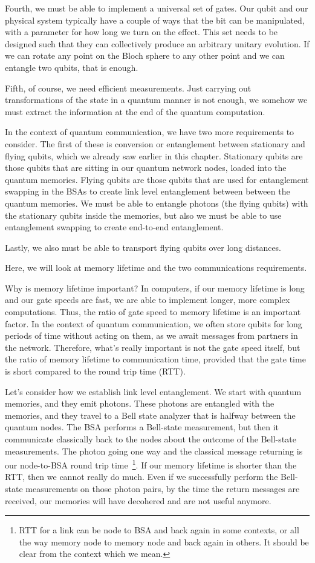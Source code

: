 Fourth, we must be able to implement a universal set of gates. Our qubit and our physical system typically have a couple of ways that the bit can be manipulated, with a parameter for how long we turn on the effect.  This set needs to be designed such that they can collectively produce an arbitrary unitary evolution. If we can rotate any point on the Bloch sphere to any other point and we can entangle two qubits, that is enough.

Fifth, of course, we need efficient measurements. Just carrying out transformations of the state in a quantum manner is not enough, we somehow we must extract the information at the end of the quantum computation.

In the context of quantum communication, we have two more requirements to consider. The first of these is conversion or entanglement between stationary and flying qubits, which we already saw earlier in this chapter. Stationary qubits are those qubits that are sitting in our quantum network nodes, loaded into the quantum memories.
Flying qubits are those qubits that are used for entanglement swapping in the BSAs to create link level entanglement between between the quantum memories. We must be able to entangle photons (the flying qubits) with the stationary qubits inside the memories, but also we must be able to use entanglement swapping to create end-to-end entanglement.

Lastly, we also must be able to transport flying qubits over long distances.

Here, we will look at memory lifetime and the two communications requirements.

Why is memory lifetime important? In computers, if our memory lifetime is long and our gate speeds are fast, we are able to implement longer, more complex computations.  Thus, the ratio of gate speed to memory lifetime is an important factor. In the context of quantum communication, we often store qubits for long periods of time without acting on them, as we await messages from partners in the network.  Therefore, what's really important is not the gate speed itself, but the ratio of memory lifetime to communication time, 
provided that the gate time is short compared to the round trip time (RTT). 

Let's consider how we establish link level entanglement. We start with quantum memories, and they emit photons. These photons are entangled with the memories, and they travel to a Bell state analyzer that is halfway between the quantum nodes. The BSA performs a Bell-state measurement, but then it communicate classically back to the nodes about the outcome of the Bell-state measurements. The photon going one way and the classical message returning is our node-to-BSA round trip time~\footnote{RTT for a link can be node to BSA and back again in some contexts, or all the way memory node to memory node and back again in others. It should be clear from the context which we mean.}. If our memory lifetime is shorter than the RTT, then we cannot really do much. Even if we successfully perform the Bell-state measurements on those photon pairs, by the time the return messages are received, our memories will have decohered and are not useful anymore.

